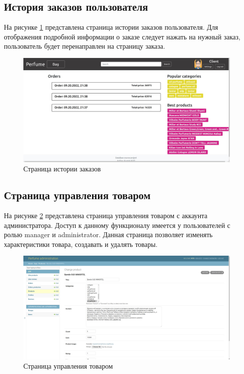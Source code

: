 \subsection{История заказов пользователя}

На рисунке \ref{site_orders} представлена страница истории заказов пользователя. Для отображения подробной информации о заказе следует нажать на нужный заказ, пользователь будет перенаправлен на страницу заказа.

\captionsetup{singlelinecheck = false, justification=centering}
\begin{figure}[h!]
	\begin{center}
		\includegraphics[scale=0.45]{assets/site_orders.jpg}
	\end{center}
	\caption{Страница истории заказов}
	\label{site_orders}
\end{figure}

\subsection{Страница управления товаром}

На рисунке \ref{site_admin_product} представлена страница управления товаром с аккаунта администратора. Доступ к данному функционалу имеется у пользователей с ролью manager и administrator. Данная страница позволяет изменять характеристики товара, создавать и удалять товары.

\captionsetup{singlelinecheck = false, justification=centering}
\begin{figure}[h!]
	\begin{center}
		\includegraphics[scale=0.45]{assets/site_admin_product.jpg}
	\end{center}
	\caption{Страница управления товаром}
	\label{site_admin_product}
\end{figure}

